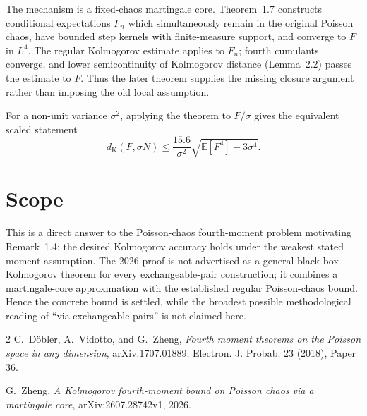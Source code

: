 \documentclass[11pt]{article}
\newcommand{\E}{\mathbb E}
\newcommand{\K}{\mathrm K}
\begin{document}
The mechanism is a fixed-chaos martingale core.  Theorem~1.7 constructs
conditional expectations $F_n$ which simultaneously remain in the original
Poisson chaos, have bounded step kernels with finite-measure support, and
converge to $F$ in $L^4$.  The regular Kolmogorov estimate applies to $F_n$;
fourth cumulants converge, and lower semicontinuity of Kolmogorov distance
(Lemma~2.2) passes the estimate to $F$.  Thus the later theorem supplies the
missing closure argument rather than imposing the old local assumption.

For a non-unit variance $\sigma^2$, applying the theorem to $F/\sigma$ gives
the equivalent scaled statement
\[
 d_{\K}(F,\sigma N)
 \le \frac{15.6}{\sigma^2}
 \sqrt{\E[F^4]-3\sigma^4}.
\]

\section{Scope}

This is a direct answer to the Poisson-chaos fourth-moment problem motivating
Remark~1.4: the desired Kolmogorov accuracy holds under the weakest stated
moment assumption.  The 2026 proof is not advertised as a general black-box
Kolmogorov theorem for every exchangeable-pair construction; it combines a
martingale-core approximation with the established regular Poisson-chaos
bound.  Hence the concrete bound is settled, while the broadest possible
methodological reading of ``via exchangeable pairs'' is not claimed here.

\begin{thebibliography}{2}
C.~D\"obler, A.~Vidotto, and G.~Zheng,
\emph{Fourth moment theorems on the Poisson space in any dimension},
arXiv:1707.01889; Electron. J. Probab. 23 (2018), Paper 36.

G.~Zheng,
\emph{A Kolmogorov fourth-moment bound on Poisson chaos via a martingale core},
arXiv:2607.28742v1, 2026.
\end{thebibliography}
\end{document}
